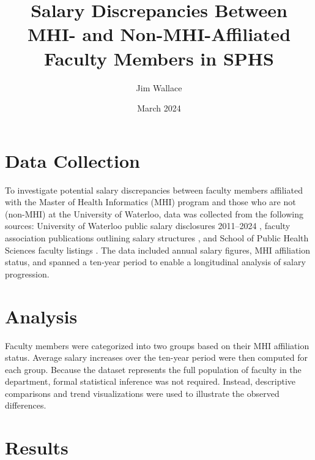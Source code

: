 \documentclass{article}
\title{Salary Discrepancies Between MHI- and Non-MHI-Affiliated \\ Faculty Members in SPHS}
\author{Jim Wallace}
\date{March 2024}
\begin{document}
\maketitle

\section{Data Collection}

To investigate potential salary discrepancies between faculty members affiliated with the Master of Health Informatics (MHI) program and those who are not (non-MHI) at the University of Waterloo, data was collected from the following sources: University of Waterloo public salary disclosures 2011--2024 \cite{uw_salary_2011, uw_salary_2012, uw_salary_2013, uw_salary_2014, uw_salary_2015, uw_salary_2016, uw_salary_2017, uw_salary_2018, uw_salary_2019, uw_salary_2020, uw_salary_2021, uw_salary_2022, uw_salary_2023, uw_salary_2024}, faculty association publications outlining salary structures \cite{fauw_salary_structure}, and School of Public Health Sciences faculty listings \cite{uwaterloo_mhi_faculty}. The data included annual salary figures, MHI affiliation status, and spanned a ten-year period to enable a longitudinal analysis of salary progression.


\section{Analysis}

Faculty members were categorized into two groups based on their MHI affiliation status. Average salary increases over the ten-year period were then computed for each group. Because the dataset represents the full population of faculty in the department, formal statistical inference was not required. Instead, descriptive comparisons and trend visualizations were used to illustrate the observed differences.


\section{Results}
\end{document}
